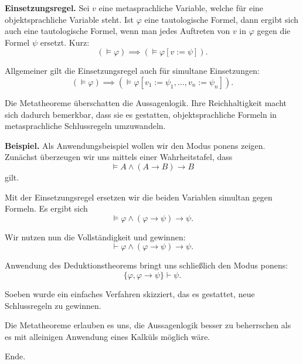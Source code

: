 \documentclass{beamer}
\newcommand{\strong}[1]{\textsf{\textbf{#1}}}
\begin{document}
\begin{frame}
\strong{Einsetzungsregel.} Sei $v$ eine metasprachliche Variable,
welche für eine objektsprachliche Variable steht. Ist $\varphi$
eine tautologische Formel, dann ergibt sich auch eine tautologische
Formel, wenn man jedes Auftreten von $v$ in $\varphi$ gegen die
Formel $\psi$ ersetzt. Kurz:
\[(\models\varphi)\implies (\models\varphi[v:=\psi]).\]
\end{frame}

\begin{frame}
Allgemeiner gilt die Einsetzungsregel auch für simultane Einsetzungen:
\[(\models\varphi)\implies (\models\varphi[v_1:=\psi_1,\ldots,v_n:=\psi_n]).\]
\end{frame}

\begin{frame}
Die Metatheoreme überschatten die Aussagenlogik. Ihre Reichhaltigkeit
macht sich dadurch bemerkbar, dass sie es gestatten,
objektsprachliche Formeln in metasprachliche Schlussregeln
umzuwandeln.
\end{frame}

\begin{frame}
\strong{Beispiel.}
Als Anwendungsbeispiel wollen wir den Modus ponens zeigen.
Zunächst überzeugen wir uns mittels einer Wahrheitstafel, dass
\[\models A\land (A\rightarrow B)\rightarrow B\]
gilt.
\end{frame}

\begin{frame}
Mit der Einsetzungsregel ersetzen wir die beiden Variablen
simultan gegen Formeln. Es ergibt sich
\[\models\varphi\land (\varphi\rightarrow\psi)\rightarrow\psi.\]
\end{frame}

\begin{frame}
Wir nutzen nun die Vollständigkeit und
gewinnen:
\[\vdash\varphi\land (\varphi\rightarrow\psi)\rightarrow\psi.\]
\end{frame}

\begin{frame}
Anwendung des Deduktionstheorems bringt uns schließlich
den Modus ponens:
\[\{\varphi,\varphi\rightarrow\psi\}\vdash\psi.\]
\end{frame}

\begin{frame}
Soeben wurde ein einfaches Verfahren skizziert, das es gestattet, neue
Schlussregeln zu gewinnen.
\end{frame}

\begin{frame}
Die Metatheoreme erlauben es uns, die Aussagenlogik besser
zu beherrschen als es mit alleinigen Anwendung eines Kalküls möglich
wäre.
\end{frame}

\begin{frame}
Ende.
\end{frame}
\end{document}
